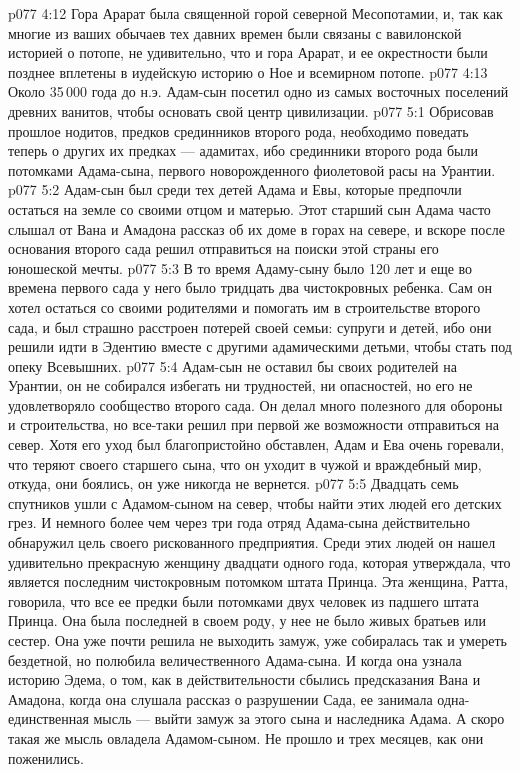 \vs p077 4:12 Гора Арарат была священной горой северной Месопотамии, и, так как многие из ваших обычаев тех давних времен были связаны с вавилонской историей о потопе, не удивительно, что и гора Арарат, и ее окрестности были позднее вплетены в иудейскую историю о Ное и всемирном потопе.
\vs p077 4:13 Около 35\,000 года до н.э. Адам\hyp{}сын посетил одно из самых восточных поселений древних ванитов, чтобы основать свой центр цивилизации.
\vs p077 5:1 Обрисовав прошлое нодитов, предков срединников второго рода, необходимо поведать теперь о других их предках --- адамитах, ибо срединники второго рода были потомками Адама\hyp{}сына, первого новорожденного фиолетовой расы на Урантии.
\vs p077 5:2 \pc Адам\hyp{}сын был среди тех детей Адама и Евы, которые предпочли остаться на земле со своими отцом и матерью. Этот старший сын Адама часто слышал от Вана и Амадона рассказ об их доме в горах на севере, и вскоре после основания второго сада решил отправиться на поиски этой страны его юношеской мечты.
\vs p077 5:3 В то время Адаму\hyp{}сыну было 120 лет и еще во времена первого сада у него было тридцать два чистокровных ребенка. Сам он хотел остаться со своими родителями и помогать им в строительстве второго сада, и был страшно расстроен потерей своей семьи: супруги и детей, ибо они решили идти в Эдентию вместе с другими адамическими детьми, чтобы стать под опеку Всевышних.
\vs p077 5:4 Адам\hyp{}сын не оставил бы своих родителей на Урантии, он не собирался избегать ни трудностей, ни опасностей, но его не удовлетворяло сообщество второго сада. Он делал много полезного для обороны и строительства, но все\hyp{}таки решил при первой же возможности отправиться на север. Хотя его уход был благопристойно обставлен, Адам и Ева очень горевали, что теряют своего старшего сына, что он уходит в чужой и враждебный мир, откуда, они боялись, он уже никогда не вернется.
\vs p077 5:5 Двадцать семь спутников ушли с Адамом\hyp{}сыном на север, чтобы найти этих людей его детских грез. И немного более чем через три года отряд Адама\hyp{}сына действительно обнаружил цель своего рискованного предприятия. Среди этих людей он нашел удивительно прекрасную женщину двадцати одного года, которая утверждала, что является последним чистокровным потомком штата Принца. Эта женщина, Ратта, говорила, что все ее предки были потомками двух человек из падшего штата Принца. Она была последней в своем роду, у нее не было живых братьев или сестер. Она уже почти решила не выходить замуж, уже собиралась так и умереть бездетной, но полюбила величественного Адама\hyp{}сына. И когда она узнала историю Эдема, о том, как в действительности сбылись предсказания Вана и Амадона, когда она слушала рассказ о разрушении Сада, ее занимала одна\hyp{}единственная мысль --- выйти замуж за этого сына и наследника Адама. А скоро такая же мысль овладела Адамом\hyp{}сыном. Не прошло и трех месяцев, как они поженились.

